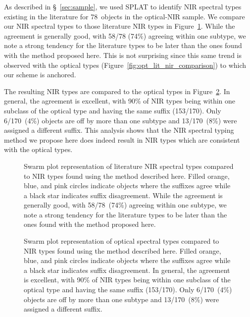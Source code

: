 \documentclass[modern,trackchanges]{aastex61}
\newcommand{\sample}{170}
\begin{document}
As described in  \S~\ref{sec:sample}, we used SPLAT to identify NIR spectral types existing in the literature for 78~objects in the optical-NIR sample.
We compare our NIR spectral types to those literature NIR types in Figure~\ref{fig:Lit NIR comparison}.
While the agreement is generally good, with 58/78 (74\%) agreeing within one subtype, we note a strong tendency for the literature types to be later than the ones found with the method proposed here.
This is not surprising since this same trend is observed with the optical types (Figure~\ref{fig:opt_lit_nir_comparison}) to which our scheme is anchored.

The resulting NIR types are compared to the optical types in Figure~\ref{fig:optical NIR comparison}.
In general, the agreement is excellent, with 90\% of NIR types being within one subclass of the optical type and having the same suffix (153/\sample).
Only 6/\sample~(4\%) objects are off by more than one subtype and 13/\sample~(8\%) were assigned a different suffix.
This analysis shows that the NIR spectral typing method we propose here does indeed result in NIR types which are consistent with the optical types.


\begin{figure}
  \caption{Swarm plot representation of literature NIR spectral types compared to NIR types found using the method described here.
  Filled orange, blue, and pink circles indicate objects where the suffixes agree while a black star indicates suffix disagreement.
  While the agreement is generally good, with 58/78~(74\%) agreeing within one subtype, we note a strong tendency for the literature types to be later than the ones found with the method proposed here.}
  \label{fig:Lit NIR comparison}
\end{figure}

\begin{figure}
  \caption{Swarm plot representation of optical spectral types compared to NIR types found using the method described here.
  Filled orange, blue, and pink circles indicate objects where the suffixes agree while a black star indicates suffix disagreement.
  In general, the agreement is excellent, with 90\% of NIR types being within one subclass of the optical type and having the same suffix (153/\sample).
  Only 6/\sample~(4\%) objects are off by more than one subtype and 13/\sample~(8\%) were assigned a different suffix.}
  \label{fig:optical NIR comparison}
\end{figure}
\end{document}
